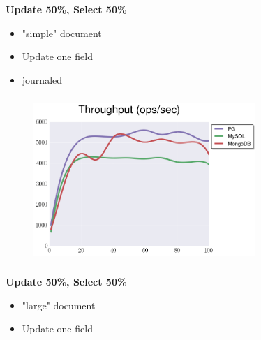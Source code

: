 \documentclass[usenames,dvipsnames, 18pt, compress, aspectratio=169]{beamer}
\begin{document}
\begin{frame}
    \frametitle{}
    \begin{center}
        \textbf{Update 50\%, Select 50\%}
        \begin{itemize}[label={}]
            \item "simple" document
            \item Update one field
            \item journaled
        \end{itemize}
    \end{center}
\end{frame}

\begin{frame}
    \frametitle{}
    \begin{center}
    \begin{figure}
        \includegraphics[width=0.75\textwidth,center]{benchmarks/update_btree_journaled_throughput.png}
    \end{figure}
    \end{center}
\end{frame}

\begin{frame}
    \frametitle{}
    \begin{center}
        \textbf{Update 50\%, Select 50\%}
        \begin{itemize}[label={}]
            \item "large" document
            \item Update one field
        \end{itemize}
    \end{center}
\end{frame}
\end{document}
